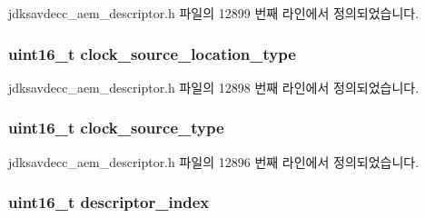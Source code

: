 jdksavdecc\+\_\+aem\+\_\+descriptor.\+h 파일의 12899 번째 라인에서 정의되었습니다.

\subsubsection[{\texorpdfstring{clock\+\_\+source\+\_\+location\+\_\+type}{clock_source_location_type}}]{\setlength{\rightskip}{0pt plus 5cm}uint16\+\_\+t clock\+\_\+source\+\_\+location\+\_\+type}\hypertarget{structjdksavdecc__descriptor__clock__source_aa1b89e381447b34cdb73d97f8e11405b}{}\label{structjdksavdecc__descriptor__clock__source_aa1b89e381447b34cdb73d97f8e11405b}


jdksavdecc\+\_\+aem\+\_\+descriptor.\+h 파일의 12898 번째 라인에서 정의되었습니다.

\subsubsection[{\texorpdfstring{clock\+\_\+source\+\_\+type}{clock_source_type}}]{\setlength{\rightskip}{0pt plus 5cm}uint16\+\_\+t clock\+\_\+source\+\_\+type}\hypertarget{structjdksavdecc__descriptor__clock__source_ae3108efe2ae46da2955a6a8aeb45ea02}{}\label{structjdksavdecc__descriptor__clock__source_ae3108efe2ae46da2955a6a8aeb45ea02}


jdksavdecc\+\_\+aem\+\_\+descriptor.\+h 파일의 12896 번째 라인에서 정의되었습니다.

\subsubsection[{\texorpdfstring{descriptor\+\_\+index}{descriptor_index}}]{\setlength{\rightskip}{0pt plus 5cm}uint16\+\_\+t descriptor\+\_\+index}\hypertarget{structjdksavdecc__descriptor__clock__source_a042bbc76d835b82d27c1932431ee38d4}{}\label{structjdksavdecc__descriptor__clock__source_a042bbc76d835b82d27c1932431ee38d4}


